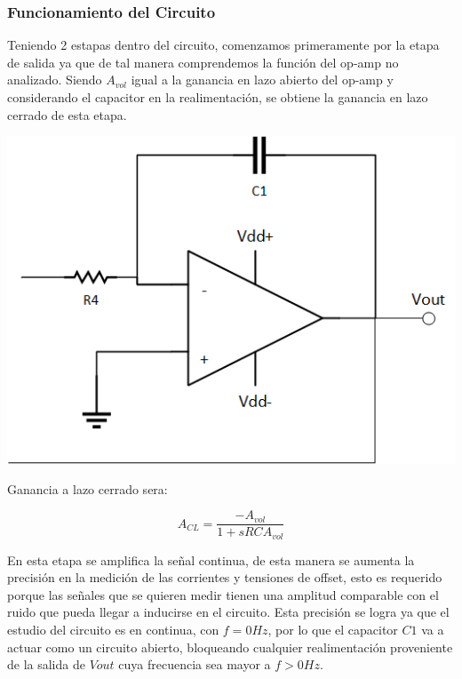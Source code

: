 \subsubsection{Funcionamiento del Circuito}

Teniendo 2 estapas dentro del circuito, comenzamos primeramente por la etapa de salida ya que de tal manera comprendemos la función del op-amp no analizado. Siendo $A_{vol}$ igual a la ganancia en lazo abierto del op-amp y considerando el capacitor en la realimentación, se obtiene la ganancia en lazo cerrado de esta etapa.

\begin{minipage}{.55\textwidth}
    \begin{center}
        \includegraphics[scale = 0.5]{../Ejercicio2-MediciondeBias/Informe/etapa2.png}
        \label{ej2et1}    
    \end{center}
\end{minipage}
\begin{minipage}{0.45\textwidth}
    Ganancia a lazo cerrado sera:
    
    $$A_{CL} = \frac{-A_{vol}}{1 + sRCA_{vol}}$$
    
\end{minipage}

En esta etapa se amplifica la señal continua, de esta manera se aumenta la precisión en la medición de las corrientes y tensiones de offset, esto es requerido porque las señales que se quieren medir tienen una amplitud comparable con el ruido que pueda llegar a inducirse en el circuito. Esta precisión se logra ya que el estudio del circuito es en continua, con $f = 0Hz$, por lo que el capacitor $C1$ va a actuar como un circuito abierto, bloqueando cualquier realimentación proveniente de la salida de $Vout$ cuya frecuencia sea mayor a $f> 0Hz$.

